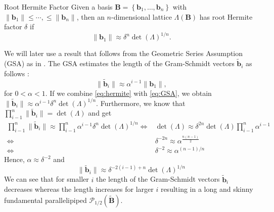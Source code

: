 \begin{definition}{Root Hermite Factor \cite{LP11}}
  Given a basis $\mathbf{B} = \left\{\mathbf{b}_1, \ldots, \mathbf{b}_n\right\}$ with $\|\mathbf{b}_1\| \leq \cdots,  \leq \|\mathbf{b}_n\|$, then an $n$-dimensional lattice $\Lambda(\mathbf{B})$ has root Hermite factor $\delta$ if
  \begin{equation} \label{eq:hermite}
    \| \mathbf{b}_1 \| \approx \delta^n \det(\Lambda)^{1/n}.
  \end{equation}
\end{definition}%
We will later use a result that follows from the Geometric Series Assumption (GSA) as in \cite{Gop16}. The GSA estimates the length of the Gram-Schmidt vectors $\tilde{\mathbf{b}}_i$ as follows \cite{Sch03}: \label{sec:GSA} %
\begin{equation} \label{eq:GSA}
  \| \tilde{\mathbf{b}}_i \| \approx \alpha^{i-1} \| \mathbf{b}_1 \|,
\end{equation}
for $0 < \alpha < 1$. If we combine \cref{eq:hermite} with \cref{eq:GSA}, we obtain  $\| \tilde{\mathbf{b}}_i \| \approx \alpha^{i-1} \delta^n \det(\Lambda)^{1/n}$. Furthermore, we know that $\prod_{i-1}^n \| \tilde{\mathbf{b}}_i \| = \det(\Lambda)$  %
and get
\begin{align*}
  \prod_{i-1}^n \| \tilde{\mathbf{b}}_i \| \approx \prod_{i-1}^n \alpha^{i-1} \delta^n \det(\Lambda)^{1/n}
  \iff & \det(\Lambda) \approx \delta^{2n} \det(\Lambda) \prod_{i-1}^n \alpha^{i-1} \\
  \iff & \delta^{-2n} \approx \alpha^{\frac{n(n-1)}{2}}                             \\
  \iff & \delta^{-2} \approx \alpha^{(n-1)/n}
\end{align*}
Hence, $\alpha \approx \delta^{-2}$ and
\begin{equation}
  \| \tilde{\mathbf{b}}_i \| \approx \delta^{-2(i-1) + n} \det(\Lambda)^{1/n}
\end{equation}
We can see that for smaller $i$ the length of the Gram-Schmidt vectors $\tilde{\mathbf{b}}_i$ decreases whereas the length increases for larger $i$ resulting in a long and skinny fundamental parallelipiped $\mathcal{P}_{1/2}(\tilde{\mathbf{B}})$.



